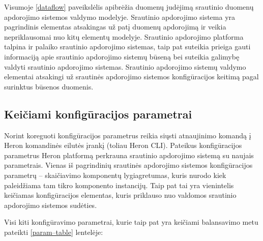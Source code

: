 \documentclass{VUMIFPSbakalaurinis}
\begin{document}
Visumoje \ref{dataflow} paveikslėlis apibrėžia duomenų judėjimą srautinio duomenų apdorojimo sistemos valdymo modelyje. Srautinio apdorojimo sistema yra pagrindinis elementas atsakingas už patį duomenų apdorojimą ir veikia nepriklausomai nuo kitų elementų modelyje. Srautinio apdorojimo platforma talpina ir palaiko srautinio apdorojimo sistemas, taip pat suteikia prieiga gauti informaciją apie srautinio apdorojimo sistemų būseną bei suteikia galimybę valdyti srautinio apdorojimo sistemas. Srautinio apdorojimo sistemų valdymo elementai atsakingi už srautinės apdorojimo sistemos konfigūracijos keitimą pagal surinktus būsenos duomenis.

\subsection{Keičiami konfigūracijos parametrai}

Norint koreguoti konfigūracijos parametrus reikia siųsti atnaujinimo komandą į Heron komandinės eilutės įrankį (toliau Heron CLI). Pateikus konfigūracijos parametrus Heron platformą perkrauna srautinio apdorojimo sistemą su naujais parametrais. 
Vienas iš pagrindinių srautinės apdorojimo sistemos konfigūracijos parametrų – skaičiavimo komponentų lygiagretumas, kuris nurodo kiek paleidžiama tam tikro komponento instancijų. Taip pat tai yra vienintelis keičiamas konfigūracijos elementas, kuris priklauso nuo valdomos srautinio apdorojimo sistemos sudėties.

Visi kiti konfigūravimo parametrai\cite{configDocument}, kurie taip pat yra keičiami balansavimo metu pateikti \ref{param–table} lentelėje:
\end{document}
